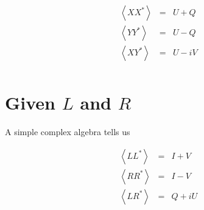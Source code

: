 \documentclass{article}
\begin{document}
\begin{eqnarray}
  \left<X X^*\right> &=& U+Q\\
  \left<Y Y^*\right> &=& U-Q\\
  \left<X Y^*\right> &=& U-iV\\
\end{eqnarray}

\section{Given $L$ and $R$}
A simple complex algebra tells us

\begin{eqnarray}
  \left<L L^*\right> &=& I+V\\
  \left<R R^*\right> &=& I-V\\
  \left<L R^*\right> &=& Q+iU\\
\end{eqnarray}
\end{document}
